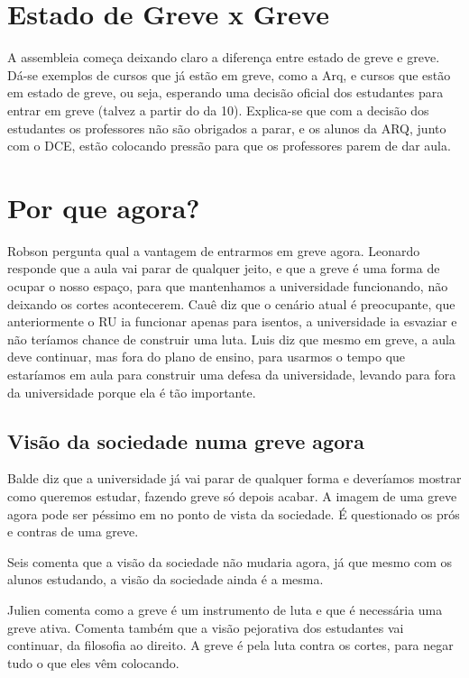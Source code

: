 \documentclass{ata-calico}
\begin{document}
\maketitle


\section{Estado de Greve x Greve}
A assembleia começa deixando claro a diferença entre estado de greve e greve. Dá-se exemplos de cursos que já estão em greve, como a Arq, e cursos que estão em estado de greve, ou seja, esperando uma decisão oficial dos estudantes para entrar em greve (talvez a partir do da 10). Explica-se que com a decisão dos estudantes os professores não são obrigados a parar,  e os alunos da ARQ, junto com o DCE, estão colocando pressão para que os professores parem de dar aula.

\section{Por que agora?}
Robson pergunta qual a vantagem de entrarmos em greve agora. Leonardo responde que a aula vai parar de qualquer jeito, e que a greve é uma forma de ocupar o nosso espaço, para que mantenhamos a universidade funcionando, não deixando os cortes acontecerem. Cauê diz que o cenário atual é preocupante, que anteriormente o RU ia funcionar apenas para isentos, a universidade ia esvaziar e não teríamos chance de construir uma luta. Luis diz que mesmo em greve, a aula deve continuar, mas fora do plano de ensino, para usarmos o tempo que estaríamos em aula para construir uma defesa da universidade, levando para fora da universidade porque ela é tão importante. 

\subsection{Visão da sociedade numa greve agora}
Balde diz que a universidade já vai parar de qualquer forma e deveríamos mostrar como queremos estudar, fazendo greve só depois acabar. A imagem de uma greve agora pode ser péssimo em no ponto de vista da sociedade. É questionado os prós e contras de uma greve.

Seis comenta que a visão da sociedade não mudaria agora, já que mesmo com os alunos estudando, a visão da sociedade ainda é a mesma.

Julien comenta como a greve é um instrumento de luta e que é necessária uma greve ativa. Comenta também que a visão pejorativa dos estudantes vai continuar, da filosofia ao direito. A greve é pela luta contra os cortes, para negar tudo o que eles vêm colocando.
\end{document}

